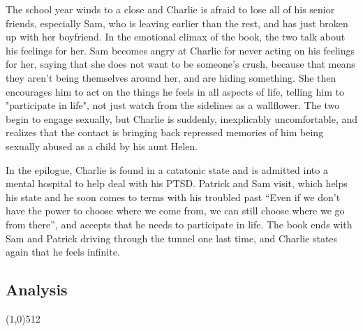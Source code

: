 \documentclass[11pt,a4paper]{report}
\let\origsection\subsection
\renewcommand{\subsection}[1]{\origsection{#1}\vspace{-0.5em}\line(1,0){512}\vspace{-1em}}
\begin{document}
\begin{multicols}{2}
		The school year winds to a close and Charlie is afraid to lose all of his senior friends, especially Sam, who is leaving earlier than the rest, and has just broken up with her boyfriend. In the emotional climax of the book, the two talk about his feelings for her. Sam becomes angry at Charlie for never acting on his feelings for her, saying that she does not want to be someone's crush, because that means they aren't being themselves around her, and are hiding something. She then encourages him to act on the things he feels in all aspects of life, telling him to "participate in life", not just watch from the sidelines as a wallflower. The two begin to engage sexually, but Charlie is suddenly, inexplicably uncomfortable, and realizes that the contact is bringing back repressed memories of him being sexually abused as a child by his aunt Helen.
		
		In the epilogue, Charlie is found in a catatonic state and is admitted into a mental hospital to help deal with his PTSD. Patrick and Sam visit, which helps his state and he soon comes to terms with his troubled past ``Even if we don't have the power to choose where we come from, we can still choose where we go from there'', and accepts that he needs to participate in life. The book ends with Sam and Patrick driving through the tunnel one last time, and Charlie states again that he feels infinite. 
		
	\end{multicols}
	
	\subsection{Analysis}
	
\end{document}
